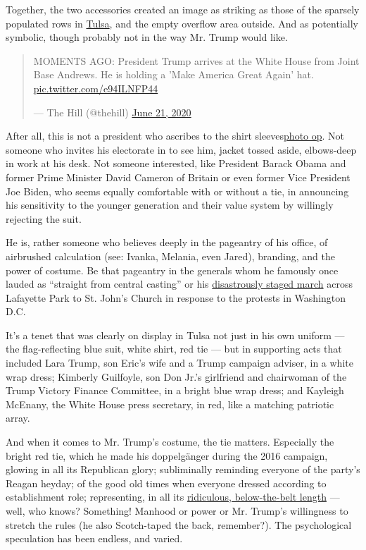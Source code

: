 Together, the two accessories created an image as striking as those of
the sparsely populated rows in
\href{https://www.nytimes.com/2020/06/22/us/politics/trump-rally-coronavirus.html}{Tulsa},
and the empty overflow area outside. And as potentially symbolic, though
probably not in the way Mr. Trump would like.

\begin{quote}
MOMENTS AGO: President Trump arrives at the White House from Joint Base
Andrews. He is holding a 'Make America Great Again' hat.
\href{https://t.co/e94ILNFP44}{pic.twitter.com/e94ILNFP44}

--- The Hill (@thehill)
\href{https://twitter.com/thehill/status/1274585675845828611?ref_src=twsrc\%5Etfw}{June
21, 2020}
\end{quote}

After all, this is not a president who ascribes to the shirt
sleeves\href{https://www.nytimes.com/2016/05/12/fashion/donald-trump-barack-obama-ties.html}{photo
op}. Not someone who invites his electorate in to see him, jacket tossed
aside, elbows-deep in work at his desk. Not someone interested, like
President Barack Obama and former Prime Minister David Cameron of
Britain or even former Vice President Joe Biden, who seems equally
comfortable with or without a tie, in announcing his sensitivity to the
younger generation and their value system by willingly rejecting the
suit.

He is, rather someone who believes deeply in the pageantry of his
office, of airbrushed calculation (see: Ivanka, Melania, even Jared),
branding, and the power of costume. Be that pageantry in the generals
whom he famously once lauded as ``straight from central casting'' or his
\href{https://www.nytimes.com/2020/06/02/us/politics/trump-walk-lafayette-square.html}{disastrously
staged march} across Lafayette Park to St. John's Church in response to
the protests in Washington D.C.

It's a tenet that was clearly on display in Tulsa not just in his own
uniform --- the flag-reflecting blue suit, white shirt, red tie --- but
in supporting acts that included Lara Trump, son Eric's wife and a Trump
campaign adviser, in a white wrap dress; Kimberly Guilfoyle, son Don
Jr.'s girlfriend and chairwoman of the Trump Victory Finance Committee,
in a bright blue wrap dress; and Kayleigh McEnany, the White House press
secretary, in red, like a matching patriotic array.

And when it comes to Mr. Trump's costume, the tie matters. Especially
the bright red tie, which he made his doppelgänger during the 2016
campaign, glowing in all its Republican glory; subliminally reminding
everyone of the party's Reagan heyday; of the good old times when
everyone dressed according to establishment role; representing, in all
its
\href{https://www.nytimes.com/2017/02/10/opinion/the-ties-that-blind.html}{ridiculous,
below-the-belt length} --- well, who knows? Something! Manhood or power
or Mr. Trump's willingness to stretch the rules (he also Scotch-taped
the back, remember?). The psychological speculation has been endless,
and varied.


